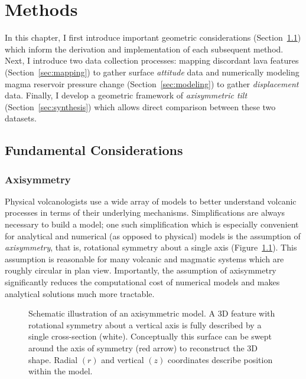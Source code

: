 \chapter{Methods}\label{cha:methods}

In this chapter, I first introduce important geometric considerations (Section~\ref{sec:considerations}) which inform the derivation and implementation of each subsequent method. Next, I introduce two data collection processes: mapping discordant lava features (Section~\ref{sec:mapping}) to gather surface \emph{attitude} data and numerically modeling magma reservoir pressure change (Section~\ref{sec:modeling}) to gather \emph{displacement} data. Finally, I develop a geometric framework of \emph{axisymmetric tilt} (Section~\ref{sec:synthesis}) which allows direct comparison between these two datasets.

\section{Fundamental Considerations}\label{sec:considerations}

\subsection{Axisymmetry}

Physical volcanologists use a wide array of models to better understand volcanic processes in terms of their underlying mechanisms. Simplifications are always necessary to build a model; one such simplification which is especially convenient for analytical and numerical (as opposed to physical) models is the assumption of \emph{axisymmetry}, that is, rotational symmetry about a single axis (Figure~\ref{fig:axisymmetry}). This assumption is reasonable for many volcanic and magmatic systems which are roughly circular in plan view. Importantly, the assumption of axisymmetry significantly reduces the computational cost of numerical models and makes analytical solutions much more tractable.

\begin{figure}
    \caption[Axisymmetry]{Schematic illustration of an axisymmetric model. A 3D feature with rotational symmetry about a vertical axis is fully described by a single cross-section (white). Conceptually this surface can be swept around the axis of symmetry (red arrow) to reconstruct the 3D shape. Radial $(r)$ and vertical $(z)$ coordinates describe position within the model.}%
    \label{fig:axisymmetry}
\end{figure}    

